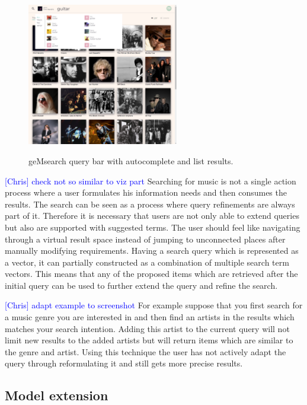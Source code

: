 \documentclass[sigconf]{acmart}
\newcommand{\ce}[1]{\textcolor{blue}{[Chris] #1}}
\newcommand{\ce}[1]{}
\begin{document}
\begin{figure}[ht]
	{\includegraphics[width=250px]{images/search-autocomplete.png}}	
	\caption{geMsearch query bar with autocomplete and list results.}
	\label{fig:web_client_query}
\end{figure}

\ce{check not so similar to viz part}
Searching for music is not a single action process where a user formulates his information needs and then consumes the results. The search can be seen as a process where query refinements are always part of it. Therefore it is necessary that users are not only able to extend queries but also are supported with suggested terms. The user should feel like navigating through a virtual result space instead of jumping to unconnected places after manually modifying requirements. Having a search query which is represented as a vector, it can partially constructed as a combination of multiple search term vectors. This means that any of the proposed items which are retrieved after the initial query can be used to further extend the query and refine the search.

\ce{adapt example to screenshot}
For example suppose that you first search for a music genre you are interested in and then find an artists in the results which matches your search intention. Adding this artist to the current query will not limit new results to the added artists but will return items which are similar to the genre and artist. Using this technique the user has not actively adapt the query through reformulating it and still gets more precise results.


\subsection{Model extension}
\label{sec:model_extension}
\end{document}
